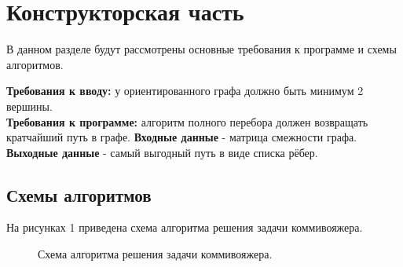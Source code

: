 \documentclass[a4paper, 12pt]{article}
\begin{document}
\newpage
\section{Конструкторская часть}
	В данном разделе будут рассмотрены основные требования к программе и схемы алгоритмов.

	{\bf \hspace*{-6mm}Требования к вводу:} у ориентированного графа должно быть минимум 2 вершины.
	\\ {\bf Требования к программе: }алгоритм полного перебора должен возвращать кратчайший путь в графе.
	\newline  
	\textbf{Входные данные} - матрица смежности графа.  
	\newline
	\textbf{Выходные данные} - самый выгодный путь в виде списка рёбер.

	\subsection{Схемы алгоритмов}
	\hspace*{5mm} На рисунках 1 приведена схема алгоритма решения задачи коммивояжера.\\
	
	\newpage   
	\begin{figure}[h]
		\caption{Схема алгоритма решения задачи коммивояжера.}
		\label{fig:ant}
	\end{figure}
	
\end{document}
